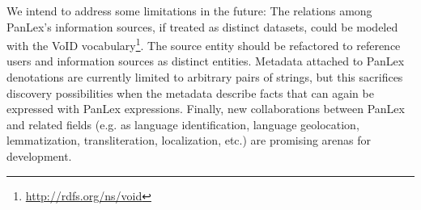\documentclass[sw]{iosart2c}
\begin{document}
We intend to address some limitations in the future:
The relations among PanLex's information sources, if treated as distinct datasets, could be modeled with the VoID vocabulary\footnote{\url{http://rdfs.org/ns/void}}.
The source entity should be refactored to reference users and information sources as distinct entities.
Metadata attached to PanLex denotations are currently limited to arbitrary pairs of strings,
but this sacrifices discovery possibilities when the metadata
describe facts that can again be expressed with PanLex expressions.
Finally, new collaborations between PanLex and related fields (e.g. as language identification, language geolocation, lemmatization, transliteration, localization, etc.) are promising arenas for development.



\end{document}
